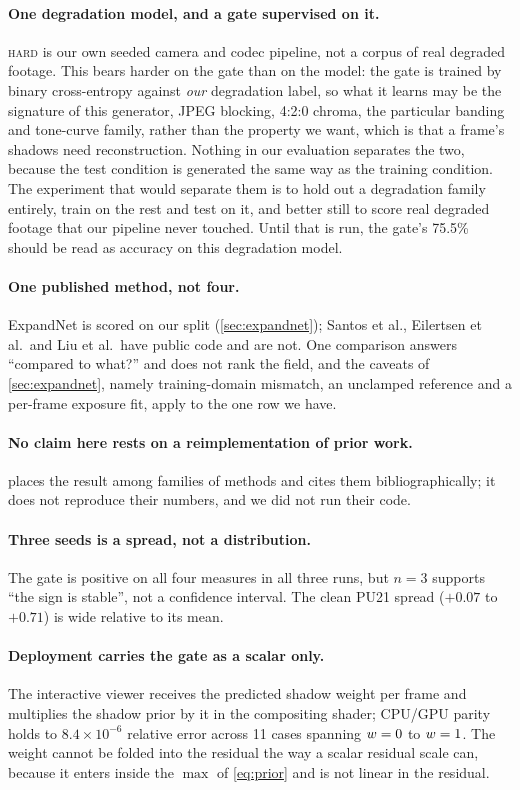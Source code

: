 \paragraph{One degradation model, and a gate supervised on it.} \textsc{hard}
is our own seeded camera and codec pipeline, not a corpus of real degraded
footage. This bears harder on the gate than on the model: the gate is trained by
binary cross-entropy against \emph{our} degradation label, so what it learns may
be the signature of this generator, JPEG blocking, 4:2:0 chroma, the particular
banding and tone-curve family, rather than the property we want, which is that a
frame's shadows need reconstruction. Nothing in our evaluation separates the
two, because the test condition is generated the same way as the training
condition. The experiment that would separate them is to hold out a degradation
family entirely, train on the rest and test on it, and better still to score
real degraded footage that our pipeline never touched. Until that is run, the
gate's 75.5\% should be read as accuracy on this degradation model.

\paragraph{One published method, not four.} ExpandNet is scored on our split
(\cref{sec:expandnet}); Santos et al., Eilertsen et al.~and Liu et al.~have
public code and are not. One comparison answers ``compared to what?'' and does
not rank the field, and the caveats of \cref{sec:expandnet}, namely
training-domain mismatch, an unclamped reference and a per-frame exposure fit,
apply to the one row we have.

\paragraph{No claim here rests on a reimplementation of prior work.}
 places the result among families of methods and cites them
bibliographically; it does not reproduce their numbers, and we did not run their
code.

\paragraph{Three seeds is a spread, not a distribution.} The gate is positive on
all four measures in all three runs, but $n = 3$ supports ``the sign is stable'',
not a confidence interval. The clean PU21 spread ($+0.07$ to $+0.71$) is wide
relative to its mean.

\paragraph{Deployment carries the gate as a scalar only.} The interactive viewer
receives the predicted shadow weight per frame and multiplies the shadow prior
by it in the compositing shader; CPU/GPU parity holds to
$8.4 \times 10^{-6}$ relative error across 11 cases spanning $w = 0$ to
$w = 1$. The weight cannot be folded into the residual the way a scalar
residual scale can, because it enters inside the $\max$ of \cref{eq:prior} and
is not linear in the residual.
